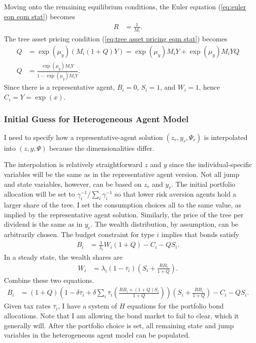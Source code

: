 \documentclass[12 pt, oneside]{article}
\theoremstyle{definition}
\theoremstyle{definition}
\theoremstyle{definition}
\begin{document}
Moving onto the remaining equilibrium conditions, the Euler equation (\ref{eq:euler eqn eqm stat}) becomes
\begin{align*}
  R & = \frac{1}{M_i}.
\end{align*}
The tree asset pricing condition (\ref{eq:tree asset pricing eqm stat}) becomes
\begin{align*}
  Q & = \exp(\mu_y) (M_i (1 + Q)Y) = \exp(\mu_y) M_i Y + \exp(\mu_y) M_i Y Q\\
  Q & = \frac{\exp(\mu_y) M_i Y}{1 - \exp(\mu_y) M_i Y}.
\end{align*}
Since there is a representative agent, $B_i = 0$, $S_i = 1$, and $W_i = 1$, hence $C_i = Y = \exp(x)$.

\subsubsection{Initial Guess for Heterogeneous Agent Model}
I need to specify how a representative-agent solution $(z_r, y_r, \Psi_r)$ is interpolated into $(z, y, \Psi)$ because the dimensionalities differ.

The interpolation is relatively straightforward $z$ and $y$ since
the individual-specific variables will be the same as in the representative agent version. Not all jump and state variables, however, can be
based on $z_r$ and $y_r$.
The initial portfolio allocation will be set to $\gamma_i^{-1} / \sum_i \gamma_i^{-1}$ so that lower risk aversion agents hold a larger share of the tree.
I set the consumption choices all to the same value, as implied by the representative agent solution. Similarly, the price of the tree per dividend is the same as in $y_r$. The wealth distribution, by assumption, can be arbitrarily chosen. The budget constraint for type $i$ implies that bonds satisfy
\begin{align*}
  B_i & = \frac{1}{\lambda_i}W_i(1 + Q) - C_i - Q S_i.
\end{align*}
In a steady state, the wealth shares are
\begin{align*}
  W_i & = \lambda_i(1 - \overline{\tau}_i)\left(S_i + \frac{R B_i}{1 + Q}\right).
\end{align*}
Combine these two equations.
\begin{align*}
  B_i & = (1 + Q)\left(1 - \delta \overline{\tau}_i + \delta \sum_i\overline{\tau}_i\left(\frac{R B_i + (1 + Q) S_i}{1 + Q}\right)\right)\left(S_i + \frac{R B_i}{1 + Q}\right) - C_i - Q S_i.
\end{align*}
Given tax rates $\overline{\tau}_i$, I have a system of $H$ equations for the portfolio bond allocations. Note that I am allowing the bond market to fail to clear, which it generally will. After the portfolio choice is set, all remaining state and jump variables in the heterogeneous agent model can be populated.
\end{document}
